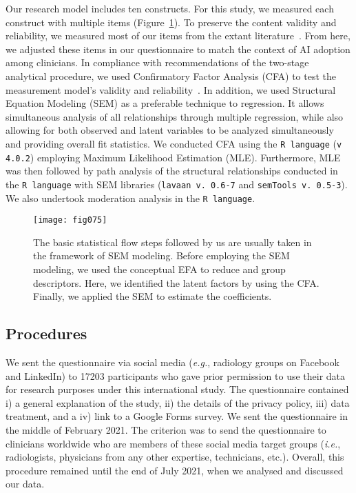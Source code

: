 Our research model includes ten constructs.
For this study, we measured each construct with multiple items (Figure~\ref{fig:fig075}).
To preserve the content validity and reliability, we measured most of our items from the extant literature~\cite{SOHN2020101324, info:doi/10.2196/14316}.
From here, we adjusted these items in our questionnaire to match the context of AI adoption among clinicians.
In compliance with recommendations of the two-stage analytical procedure, we used Confirmatory Factor Analysis (CFA) to test the measurement model’s validity and reliability~\cite{2019-07124-034}.
In addition, we used Structural Equation Modeling (SEM) as a preferable technique to regression.
It allows simultaneous analysis of all relationships through multiple regression, while also allowing for both observed and latent variables to be analyzed simultaneously and providing overall fit statistics.
We conducted CFA using the \texttt{R language} (\texttt{v 4.0.2}) employing Maximum Likelihood Estimation (MLE).
Furthermore, MLE was then followed by path analysis of the structural relationships conducted in the \texttt{R language} with SEM libraries (\texttt{lavaan v. 0.6-7} and \texttt{semTools v. 0.5-3}).
We also undertook moderation analysis in the \texttt{R language}.

\begin{figure}[htpb]
\centering
\texttt{[image: fig075]}
\caption{The basic statistical flow steps followed by us are usually taken in the framework of SEM modeling. Before employing the SEM modeling, we used the conceptual EFA to reduce and group descriptors. Here, we identified the latent factors by using the CFA. Finally, we applied the SEM to estimate the coefficients.}
\label{fig:fig075}
\end{figure}

\subsection{Procedures}
\label{sec:chap004004001}

We sent the questionnaire via social media ({\it e.g.}, radiology groups on Facebook and LinkedIn) to 17203 participants who gave prior permission to use their data for research purposes under this international study.
The questionnaire contained i) a general explanation of the study, ii) the details of the privacy policy, iii) data treatment, and a iv) link to a Google Forms survey.
We sent the questionnaire in the middle of February 2021.
The criterion was to send the questionnaire to clinicians worldwide who are members of these social media target groups ({\it i.e.}, radiologists, physicians from any other expertise, technicians, etc.).
Overall, this procedure remained until the end of July 2021, when we analysed and discussed our data.

